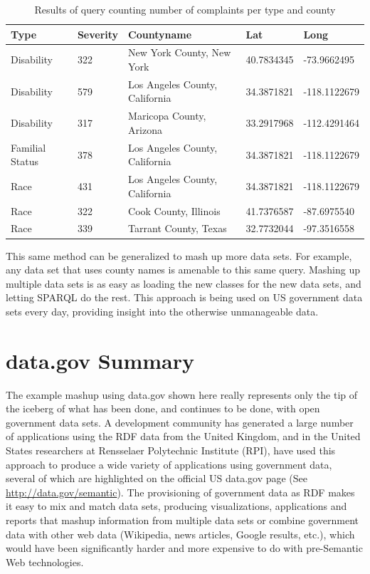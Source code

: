 \begin{table}
\caption{Results of query counting number of complaints per type and county}
\label{tab:ch10.2}
\begin{tabular}{|lllll|}
\hline
Type&Severity&Countyname&Lat&Long\\
\hline
Disability&322&New York County, New York&40.7834345&-73.9662495\\
Disability&579&Los Angeles County, California&34.3871821&-118.1122679\\
Disability&317&Maricopa County, Arizona&33.2917968&-112.4291464\\
Familial Status&378&Los Angeles County, California&34.3871821&-118.1122679\\
Race&431&Los Angeles County, California&34.3871821&-118.1122679\\
Race&322&Cook County, Illinois&41.7376587&-87.6975540\\
Race&339&Tarrant County, Texas&32.7732044&-97.3516558\\
\hline
\end{tabular}
\end{table}


This same method can be generalized to mash up more data sets. For
example, any data set that uses county names is amenable to this same
query. Mashing up multiple data sets is as easy as loading the new
classes for the new data sets, and letting SPARQL do the rest. This
approach is being used on US government data sets every day, providing
insight into the otherwise unmanageable data.

\section{data.gov Summary}

The example mashup using data.gov shown here really represents only the
tip of the iceberg of what has been done, and continues to be done, with
open government data sets. A development community has generated a large
number of applications using the RDF data from the United Kingdom, and
in the United States researchers at Rensselaer Polytechnic Institute
(RPI), have used this approach to produce a wide variety of applications
using government data, several of which are highlighted on the official
US data.gov page (See \url{http://data.gov/semantic}). The provisioning
of government data as RDF makes it easy to mix and match data sets,
producing visualizations, applications and reports that mashup
information from multiple data sets or combine government data with
other web data (Wikipedia, news articles, Google results, etc.), which
would have been significantly harder and more expensive to do with
pre-Semantic Web technologies.

